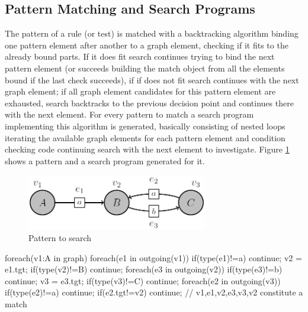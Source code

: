 \subsection*{Pattern Matching and Search Programs}
The pattern of a rule (or test) is matched with a backtracking algorithm binding one pattern element after another to a graph element, checking if it fits to the already bound parts. If it does fit search continues trying to bind the next pattern element (or succeeds building the match object from all the elements bound if the last check succeeds), if if does not fit search continues with the next graph element; if all graph element candidates for this pattern element are exhausted, search backtracks to the previous decision point and continues there with the next element.
For every pattern to match a search program implementing this algorithm is generated, basically consisting of nested loops iterating the available graph elements for each pattern element and condition checking code continuing search with the next element to investigate.
Figure \ref{figpatterntosearchfirst} shows a pattern and a search program generated for it.

\begin{figure}[htbp]
  \centering
  \includegraphics[width=0.7\textwidth]{fig/Pattern}
  \caption{Pattern to search}
  \label{figpatterntosearchfirst}
\end{figure}

\begin{csharp}
foreach(v1:A in graph) {
	foreach(e1 in outgoing(v1)) {
		if(type(e1)!=a) continue;
		v2 = e1.tgt;
		if(type(v2)!=B) continue;
		foreach(e3 in outgoing(v2)) {
			if(type(e3)!=b) continue;
			v3 = e3.tgt;
			if(type(v3)!=C) continue;
			foreach(e2 in outgoing(v3)) {
				if(type(e2)!=a) continue;
				if(e2.tgt!=v2) continue;
				// v1,e1,v2,e3,v3,v2 constitute a match
			} 
		}
	}
}
\end{csharp}

